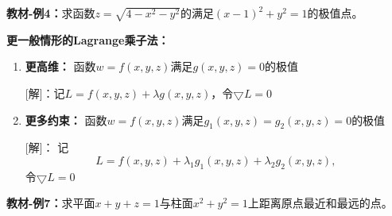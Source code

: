{\bf 教材-例4：}求函数$z=\sqrt{4-x^2-y^2}$的满足$(x-1)^2+y^2=1$的极值点。

\begin{center}
\end{center}

{\bf 更一般情形的Lagrange乘子法：}

\begin{enumerate}[(1)]
  \setlength{\itemindent}{1cm}
  \item {\bf 更高维：} 函数$w=f(x,y,z)$满足$g(x,y,z)=0$的极值 
  
  [解]：记$L=f(x,y,z)+\lambda g(x,y,z)$，令$\bigtriangledown L=0$ 
  \item {\bf 更多约束：} 函数$w=f(x,y,z)$满足$g_1(x,y,z)=g_2(x,y,z)=0$的极值 
  
  [解]： 记
  $$L=f(x,y,z)+\lambda_1 g_1(x,y,z)+\lambda_2 g_2(x,y,z),$$
  令$\bigtriangledown L=0$
\end{enumerate}

{\bf 教材-例7：}求平面$x+y+z=1$与柱面$x^2+y^2=1$上距离原点最近和最远的点。

